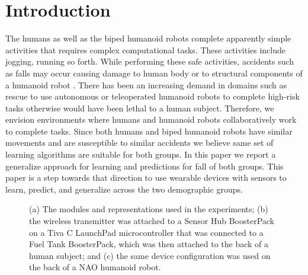 \documentclass[letterpaper]{article}
\begin{document}
\section{Introduction}

The humans as well as the biped humanoid robots complete apparently simple activities that requires 
complex computational tasks. These activities include jogging, running so forth. While performing 
these safe activities, accidents such as falls may occur causing damage to human body or to 
structural components of a humanoid robot \cite{li2009accurate}. There has been an 
increasing demand in domains such as rescue to use autonomous or teleoperated humanoid robots to 
complete high-risk tasks otherwise would have been lethal to a human subject. Therefore, we 
envision environments where humans and humanoid robots collaboratively work to complete 
tasks. Since both humans and biped humanoid robots have similar movements and are susceptible to 
similar accidents we believe same set of learning algorithms are suitable for both groups. In this 
paper we report a generalize approach for learning and predictions for fall of both groups.  This 
paper is a step towards that direction to use wearable devices with sensors to 
learn, predict, and generalize across the two demographic groups.

\begin{figure}[!t]
\centering
{}
\caption{(a) The modules and representations used in the experiments;  (b) the wireless transmitter 
was attached to a Sensor Hub BoosterPack on a Tiva C LaunchPad microcontroller that was connected to 
a Fuel Tank BoosterPack, which was then attached to the back of a human subject; and (c) the same 
device configuration was used on the back of a NAO humanoid robot.}
 \label{fig:framework}
\end{figure}
\end{document}
